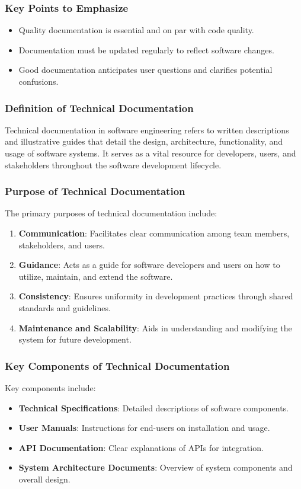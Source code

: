 \documentclass{beamer}
\begin{document}
\begin{frame}[fragile]
    \frametitle{Key Points to Emphasize}
    \begin{itemize}
        \item Quality documentation is essential and on par with code quality.
        \item Documentation must be updated regularly to reflect software changes.
        \item Good documentation anticipates user questions and clarifies potential confusions.
    \end{itemize}
\end{frame}

\begin{frame}[fragile]
    \frametitle{Definition of Technical Documentation}
    Technical documentation in software engineering refers to written descriptions and illustrative guides that detail the design, architecture, functionality, and usage of software systems. It serves as a vital resource for developers, users, and stakeholders throughout the software development lifecycle.
\end{frame}

\begin{frame}[fragile]
    \frametitle{Purpose of Technical Documentation}
    The primary purposes of technical documentation include:
    
    \begin{enumerate}
        \item \textbf{Communication}: Facilitates clear communication among team members, stakeholders, and users.
        \item \textbf{Guidance}: Acts as a guide for software developers and users on how to utilize, maintain, and extend the software.
        \item \textbf{Consistency}: Ensures uniformity in development practices through shared standards and guidelines.
        \item \textbf{Maintenance and Scalability}: Aids in understanding and modifying the system for future development.
    \end{enumerate}
\end{frame}

\begin{frame}[fragile]
    \frametitle{Key Components of Technical Documentation}
    Key components include:
    
    \begin{itemize}
        \item \textbf{Technical Specifications}: Detailed descriptions of software components.
        \item \textbf{User Manuals}: Instructions for end-users on installation and usage.
        \item \textbf{API Documentation}: Clear explanations of APIs for integration.
        \item \textbf{System Architecture Documents}: Overview of system components and overall design.
    \end{itemize}
\end{frame}
\end{document}
